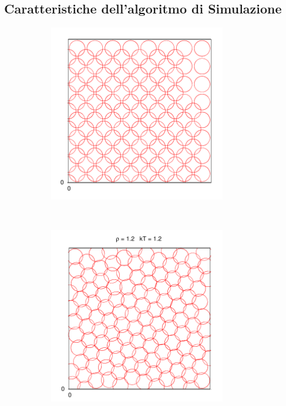 \subsection{Caratteristiche dell'algoritmo di Simulazione}
\begin{figure}[htbp]
		\caption[Sfere Soffici$/$Preliminari\_Snap2D.cpp]{Immagini del sistema 2D termalizzato a diversi valori di densità e Temperatura (In alto a sinistra è visibile la configurazione inziale prima dell'evoluzione temporale).}\vspace{-15pt}
        \begin{subfigure}[b]{0.5\textwidth}
                \centering
                \includegraphics[width=0.85\textwidth]{Immagini/Soffici/SnapSolidoCompresso_Inizio_2D}
        \end{subfigure}%
        ~ %
        \begin{subfigure}[b]{0.5\textwidth}
                \centering
                \includegraphics[width=0.85\textwidth]{Immagini/Soffici/SnapSolidoCompresso_2D}

\end{subfigure}
\end{figure}
